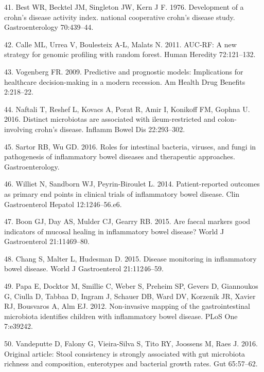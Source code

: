 \documentclass[12pt,]{article}
\begin{document}
\hypertarget{ref-Best_CDAI_1976}{}
41. Best WR, Becktel JM, Singleton JW, Kern J F. 1976. Development of a
crohn's disease activity index. national cooperative crohn's disease
study. Gastroenterology 70:439--44.

\hypertarget{ref-calle_aucrf_2011}{}
42. Calle ML, Urrea V, Boulesteix A-L, Malats N. 2011. AUC-RF: A new
strategy for genomic profiling with random forest. Human Heredity
72:121--132.

\hypertarget{ref-Vogenberg_progmods_2009}{}
43. Vogenberg FR. 2009. Predictive and prognostic models: Implications
for healthcare decision-making in a modern recession. Am Health Drug
Benefits 2:218--22.

\hypertarget{ref-naftali_tissinvol_2016}{}
44. Naftali T, Reshef L, Kovacs A, Porat R, Amir I, Konikoff FM, Gophna
U. 2016. Distinct microbiotas are associated with ileum-restricted and
colon-involving crohn's disease. Inflamm Bowel Dis 22:293--302.

\hypertarget{ref-sartor_microbesIBD_2016}{}
45. Sartor RB, Wu GD. 2016. Roles for intestinal bacteria, viruses, and
fungi in pathogenesis of inflammatory bowel diseases and therapeutic
approaches. Gastroenterology.

\hypertarget{ref-Williet2014_PROs}{}
46. Williet N, Sandborn WJ, Peyrin-Biroulet L. 2014. Patient-reported
outcomes as primary end points in clinical trials of inflammatory bowel
disease. Clin Gastroenterol Hepatol 12:1246--56.e6.

\hypertarget{ref-boon_fmarkers_2015}{}
47. Boon GJ, Day AS, Mulder CJ, Gearry RB. 2015. Are faecal markers good
indicators of mucosal healing in inflammatory bowel disease? World J
Gastroenterol 21:11469--80.

\hypertarget{ref-chang_monitoring_2015}{}
48. Chang S, Malter L, Hudesman D. 2015. Disease monitoring in
inflammatory bowel disease. World J Gastroenterol 21:11246--59.

\hypertarget{ref-papa_pedsIBD_2012}{}
49. Papa E, Docktor M, Smillie C, Weber S, Preheim SP, Gevers D,
Giannoukos G, Ciulla D, Tabbaa D, Ingram J, Schauer DB, Ward DV,
Korzenik JR, Xavier RJ, Bousvaros A, Alm EJ. 2012. Non-invasive mapping
of the gastrointestinal microbiota identifies children with inflammatory
bowel disease. PLoS One 7:e39242.

\hypertarget{ref-vandeputte_stoolcon_2016}{}
50. Vandeputte D, Falony G, Vieira-Silva S, Tito RY, Joossens M, Raes J.
2016. Original article: Stool consistency is strongly associated with
gut microbiota richness and composition, enterotypes and bacterial
growth rates. Gut 65:57--62.
\end{document}
